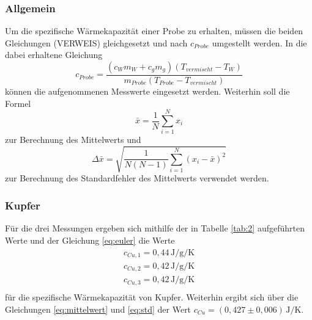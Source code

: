 \subsubsection{Allgemein}

Um die spezifische Wärmekapazität einer Probe zu erhalten, müssen die beiden Gleichungen (VERWEIS)
gleichgesetzt und nach $c_{Probe}$ umgestellt werden. In die dabei erhaltene Gleichung
\begin{equation}
    c_{Probe} = \frac{(c_{W} m_{W} + c_{g} m_{g}) (T_{vermischt}-T_{W}) }{m_{Probe} (T_{Probe}-T_{vermischt})}
    \label{eq:euler}
\end{equation}
\noindent können die aufgenommenen Messwerte eingesetzt werden. Weiterhin soll die Formel
\begin{equation}
    \bar{x}=\frac{1}{N}\sum_{i=1}^N x_i
    \label{eq:mittelwert}
\end{equation}
\noindent zur Berechnung des Mittelwerts und
\begin{equation}
     \Delta\bar{x}=\sqrt{\frac{1}{N(N-1)}\sum_{i=1}^N (x_i-\bar{x})^2}
     \label{eq:std}
 \end{equation}
\noindent zur Berechnung des Standardfehler des Mittelwerts verwendet werden.



\subsubsection{Kupfer}

Für die drei Messungen ergeben sich mithilfe der in Tabelle \ref{tab:2} aufgeführten Werte 
und der Gleichung \ref{eq:euler} die Werte 
\begin{align}
    c_{Cu,1} = 0,44\, \si{\joule\per\gram\per\kelvin} \nonumber \\
    c_{Cu,2} = 0,42\, \si{\joule\per\gram\per\kelvin} \nonumber \\
    c_{Cu,3} = 0,42\, \si{\joule\per\gram\per\kelvin} \\
    \label{align:wertekupfer}
\end{align}
\noindent für die spezifische Wärmekapazität von Kupfer. Weiterhin ergibt sich über die 
Gleichungen \ref{eq:mittelwert} und \ref{eq:std} der 
Wert $c_{Cu} = (0,427 \pm 0,006)\, \si{\joule\per\kelvin}$.




